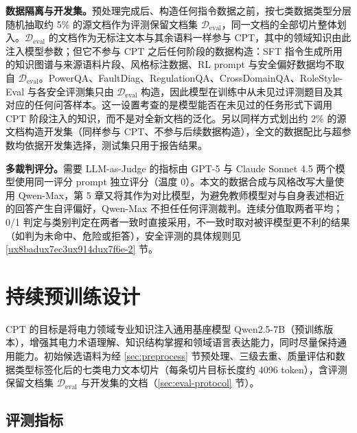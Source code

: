 \documentclass[fontset=fandol,type=master,campus=shenzhen,etitleauto=true]{hithesisbook}
\begin{document}
\textbf{数据隔离与开发集。}预处理完成后、构造任何指令数据之前，按七类数据类型分层随机抽取约 5\% 的源文档作为评测保留文档集 $\mathcal{D}_{\text{eval}}$，同一文档的全部切片整体划入。$\mathcal{D}_{\text{eval}}$ 的文档作为无标注文本与其余语料一样参与 CPT，其中的领域知识由此注入模型参数；但它不参与 CPT 之后任何阶段的数据构造：SFT 指令生成所用的知识图谱与来源语料片段、风格标注数据、RL prompt 与安全偏好数据均不取自 $\mathcal{D}_{\text{eval}}$。PowerQA、FaultDiag、RegulationQA、CrossDomainQA、RoleStyle-Eval 与各安全评测集只由 $\mathcal{D}_{\text{eval}}$ 构造，因此模型在训练中从未见过评测题目及其对应的任何问答样本。这一设置考查的是模型能否在未见过的任务形式下调用 CPT 阶段注入的知识，而不是对全新文档的泛化。另以同样方式划出约 2\% 的源文档构造开发集（同样参与 CPT、不参与后续数据构造），全文的数据配比与超参数均依据开发集选择，测试集只用于报告结果。

\textbf{多裁判评分。}需要 LLM-as-Judge\cite{ref65} 的指标由 GPT-5 与 Claude Sonnet 4.5 两个模型使用同一评分 prompt 独立评分（温度 0）。本文的数据合成与风格改写大量使用 Qwen-Max，第 5 章又将其作为对比模型，为避免教师模型对与自身表述相近的回答产生自评偏好，Qwen-Max 不担任任何评测裁判。连续分值取两者平均；0/1 判定与类别判定在两者一致时直接采用，不一致时取对被评模型更不利的结果（如判为未命中、危险或拒答），安全评测的具体规则见 \ref{ux8badux7ec3ux914dux7f6e-2} 节。

\section{持续预训练设计}\label{sec:cpt}

CPT 的目标是将电力领域专业知识注入通用基座模型 Qwen2.5-7B\cite{ref55}（预训练版本），增强其电力术语理解、知识结构掌握和领域语言表达能力，同时尽量保持通用能力。初始候选语料为经 \ref{sec:preprocess} 节预处理、三级去重、质量评估和数据类型标签化后的七类电力文本切片（每条切片目标长度约 4096 token），含评测保留文档集 $\mathcal{D}_{\text{eval}}$ 与开发集的文档（\ref{sec:eval-protocol} 节）。

\subsection{评测指标}\label{subsec:cpt-eval}
\end{document}
